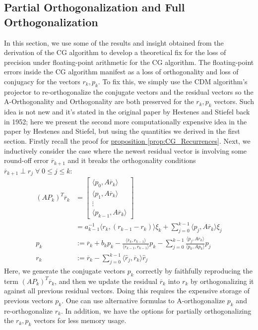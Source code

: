 \documentclass[]{article}
\theoremstyle{definition}
\begin{document}
    \subsection{Partial Orthogonalization and Full Orthogonalization}
        In this section, we use some of the results and insight obtained from the derivation of the CG algorithm to develop a theoretical fix for the loss of precision under floating-point arithmetic for the CG algorithm. The floating-point errors inside the CG algorithm manifest as a loss of orthogonality and loss of conjugacy for the vectors $r_k, p_k$. To fix this, we simply use the CDM algorithm's projector to re-orthogonalize the conjugate vectors and the residual vectors so the A-Orthogonality and Orthogonality are both preserved for the $r_k, p_k$ vectors. Such idea is not new and it's stated in the original paper by Hestenes and Stiefel back in 1952\cite{paper:cg_original}; here we present the second more computationally expensive idea in the paper by Hestenes and Stiefel, but using the quantities we derived in the first section. Firstly recall the proof for \hyperref[prop:CG_Recurrences]{proposition \ref*{prop:CG_Recurrences}}. Next, we inductively consider the case where the newest residual vector is involving some round-off error $\overline{r}_{k + 1}$ and it breaks the orthogonality conditions $\overline{r}_{k + 1} \perp r_{j} \; \forall \; 0 \le j \le k$: 
        \begin{align}
            (AP_k)^T\overline{r}_k &= 
            \begin{bmatrix}
                \langle p_0, A\overline{r}_k\rangle
                \\
                \langle p_1, A\overline{r}_k\rangle
                \\
                \vdots
                \\
                \langle p_{k - 1}, A\overline{r}_k\rangle
            \end{bmatrix}
            \\
            & = 
            a_{k - 1}^{-1}\langle r_k, (r_{k - 1} - r_k)\rangle\xi_k + \sum_{j = 0}^{k - 1}\langle p_j, A\overline{r}_k\rangle \xi_j
            \\
            p_k &:= \overline{r}_k + b_kp_k - 
                \frac{\langle \overline{r}_k, r_{k -1}\rangle}{\langle r_{k - 1}, r_{k - 1}\rangle}p_k
            - \sum_{j = 0}^{k - 1}\frac{\langle p_j, A\overline{r}_k\rangle}{\langle p_k, Ap_k\rangle}p_j
            \\
            r_k &:= \overline{r}_k - \sum_{j = 0}^{k - 1} \langle \hat{r}_j,\overline{r}_k\rangle \hat{r}_j
        \end{align}
        Here, we generate the conjugate vectors $p_k$ correctly by faithfully reproducing the term $(AP_k)^T\overline{r}_k$, and then we update the residual $\overline{r}_k$ into $r_k$ by orthogonalizing it against all previous residual vectors. Doing this requires the expensive storage of previous vectors $p_k$. One can use alternative formulas to A-orthogonalize $p_k$ and re-orthogonalize $r_k$. In addition, we have the options for partially orthogonalizing the $r_k, p_k$ vectors for less memory usage. 
\end{document}
